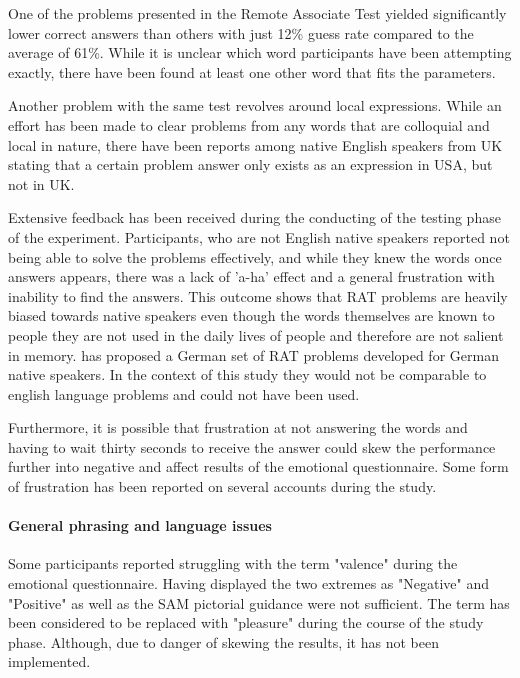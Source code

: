 	One of the problems presented in the Remote Associate Test yielded significantly lower correct answers than others with just 12\% guess rate compared to the average of 61\%. While it is unclear which word participants have been attempting exactly, there have been found at least one other word that fits the parameters.
	
	Another problem with the same test revolves around local expressions. While an effort has been made to clear problems from any words that are colloquial and local in nature, there have been reports among native English speakers from UK stating that a certain problem answer only exists as an expression in USA, but not in UK.	%
	
	Extensive feedback has been received during the conducting of the testing phase of the experiment. Participants, who are not English native speakers reported not being able to solve the problems effectively, and while they knew the words once answers appears, there was a lack of 'a-ha' effect and a general frustration with inability to find the answers. This outcome shows that RAT problems are heavily biased towards native speakers even though the words themselves are known to people they are not used in the daily lives of people and therefore are not salient in memory. \cite{Landmann2014} has proposed a German set of RAT problems developed for German native speakers. In the context of this study they would not be comparable to english language problems and could not have been used.
	
	Furthermore, it is possible that frustration at not answering the words and having to wait thirty seconds to receive the answer could skew the performance further into negative and affect results of the emotional questionnaire. Some form of frustration has been reported on several accounts during the study.
	

	\paragraph{General phrasing and language issues}
	
	Some participants reported struggling with the term "valence" during the emotional questionnaire. Having displayed the two extremes as "Negative" and "Positive" as well as the SAM pictorial guidance were not sufficient. The term has been considered to be replaced with "pleasure" during the course of the study phase. Although, due to danger of skewing the results, it has not been implemented.
	

